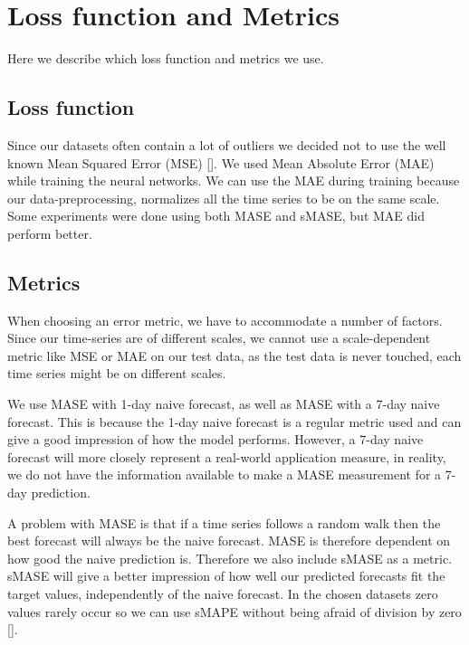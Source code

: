 
\section{Loss function and Metrics}
\label{section:Method:Metrics}

Here we describe which loss function and metrics we use.

\subsection*{Loss function}
Since our datasets often contain a lot of outliers we decided not to use the well known
Mean Squared Error (MSE) [].
We used Mean Absolute Error (MAE) while training the neural networks. We can use the MAE during training because our data-preprocessing,
normalizes all the time series to be on the same scale.
Some experiments were done using both MASE and sMASE, but MAE did perform better.

\subsection*{Metrics}
When choosing an error metric, we have to accommodate a number of factors.
Since our time-series are of different scales, we cannot use a scale-dependent metric
like MSE or MAE on our test data, as the test data is never touched, each time series might be on different scales.

We use MASE with 1-day naive forecast, as well as MASE with a 7-day
naive forecast. This is because the 1-day naive forecast is a regular metric used
and can give a good impression of how the model performs.
However, a 7-day naive forecast will more closely represent a real-world application measure,
in reality, we do not have the information available to make a MASE measurement for a 7-day prediction.

A problem with MASE is that if a time series follows a random walk
then the best forecast will always be the naive forecast. MASE is therefore dependent on
how good the naive prediction is.
Therefore we also include sMASE as a metric.
sMASE will give a better impression of how well our predicted forecasts fit the target values,
independently of the naive forecast.
In the chosen datasets zero values rarely occur so we can use sMAPE without
being afraid of division by zero [].

